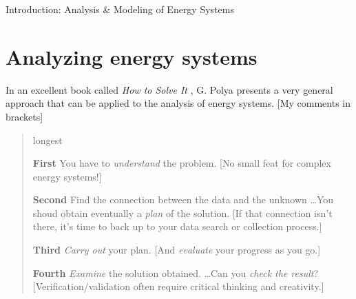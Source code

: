 \documentclass[10pt]{article}
\begin{document}
   \noindent
   \begin{center}

   \hrulefill
   
   \vspace{5pt}
   
   \vspace{0pt}
   
   {\Large \hfill Introduction: Analysis \& Modeling of Energy Systems}
   \vspace{5pt}
   
  
   \hrulefill
   \end{center}

{}

\section{Analyzing energy systems}
In an excellent book called \textit{How to Solve It} \cite{polya}, G. Polya presents a very general approach that can be applied to the analysis of energy systems. [My comments in brackets]

\begin{quote}

\begin{labeling}{longest}
\item [\textbf{First}] You have to \textit{understand} the problem. \cite{polya} [No small feat for complex energy systems!]
\item [\textbf{Second}] Find the connection between the data and the unknown \ldots You shoud obtain eventually a \textit{plan} of the solution. \cite{polya} [If that connection isn't there, it's time to back up to your data search or collection process.]
\item [\textbf{Third}] \textit{Carry out} your plan. \cite{polya} [And \textit{evaluate} your progress as you go.]
\item [\textbf{Fourth}] \textit{Examine} the solution obtained. \ldots Can you \textit{check the result}?  \cite{polya} [Verification/validation often require critical thinking and creativity.]

\end{labeling}

\end{quote}
\end{document}
